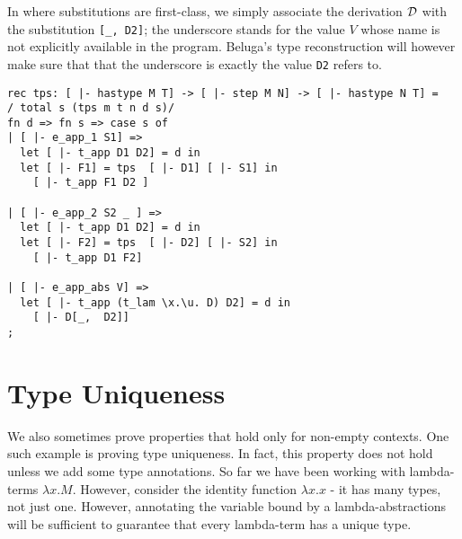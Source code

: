 
In \beluga where substitutions are first-class, we simply associate the derivation ${\mathcal{D}}$ with the substitution \lstinline![_, D2]!; the underscore stands for the value $V$ whose name is not explicitly available in the program. Beluga's type
reconstruction will however make sure that that the underscore is
exactly the value \lstinline!D2! refers to.


\begin{lstlisting}
rec tps: [ |- hastype M T] -> [ |- step M N] -> [ |- hastype N T] =
/ total s (tps m t n d s)/
fn d => fn s => case s of
| [ |- e_app_1 S1] =>
  let [ |- t_app D1 D2] = d in
  let [ |- F1] = tps  [ |- D1] [ |- S1] in
    [ |- t_app F1 D2 ]

| [ |- e_app_2 S2 _ ] =>
  let [ |- t_app D1 D2] = d in
  let [ |- F2] = tps  [ |- D2] [ |- S2] in
    [ |- t_app D1 F2]

| [ |- e_app_abs V] =>
  let [ |- t_app (t_lam \x.\u. D) D2] = d in
    [ |- D[_,  D2]]
;
\end{lstlisting}


\section{Type Uniqueness}\label{chap:proofs-open-derivations}
We also sometimes prove properties that hold only for non-empty
contexts. One such example is proving type uniqueness. In fact, this property does not hold unless we add some type annotations. So far we have
been working with lambda-terms $\lambda x.M$. However, consider the identity function $\lambda x.x$ - it has many types, not just one. However, annotating the variable bound by a lambda-abstractions will be sufficient to guarantee that every lambda-term has a unique type.

